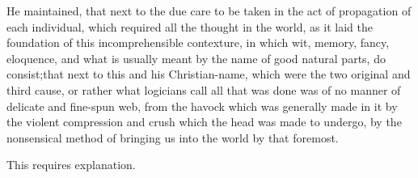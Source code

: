 \documentclass{article}
\begin{document}
He maintained, that next to the due care to be taken in the act
of propagation of each individual, which required all the thought
in the world, as it laid the foundation of this incomprehensible
contexture, in which wit, memory, fancy, eloquence, and what is
usually meant by the name of good natural parts, do
consist;\tsk that next to this and his Christian-name, which were
the two original and
third cause, or rather what logicians
call 
all that was done was of no manner of 
delicate and fine-spun web, from the havock
which was generally made in it by
the violent compression and crush
which the head was made to undergo, by the nonsensical method of
bringing us into the world by that foremost.

\tsh This requires explanation.
\end{document}
